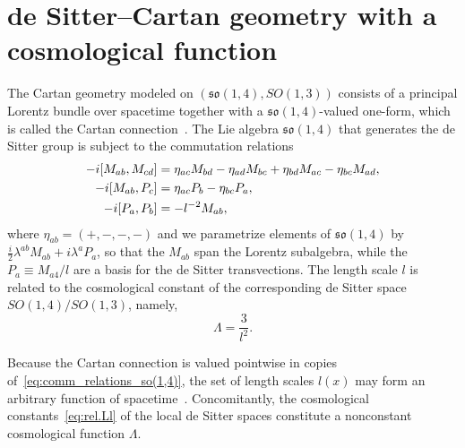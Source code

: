 \documentclass[%
aps,
prd,
reprint
]{revtex4-1}
\def\mf{\mathfrak}
\begin{document}
\section{de Sitter--Cartan geometry with a cosmological function}
\label{sec:dSCgeo}

The Cartan geometry modeled on $(\mf{so}(1,4),SO(1,3))$ 
consists of a principal Lorentz bundle over spacetime together 
with a $\mf{so}(1,4)$-valued one-form, which is called the 
Cartan connection~\cite{Alekseevsky:1995cc, sharpe1997diff_geo, 
  Wise:2009fu, Wise:2010sm}. The Lie algebra $\mf{so}(1,4)$ 
that generates the de Sitter group is subject to the commutation 
relations
\begin{align}
  -i[M_{ab},M_{cd}] &= \eta_{ac}M_{bd} - \eta_{ad}M_{bc} 
  + \eta_{bd}M_{ac} - \eta_{bc}M_{ad},
  \notag\\
  -i[M_{ab},P_c] &= \eta_{ac}P_b- \eta_{bc}P_a,
  \notag\\
  -i[P_a,P_b] &= -l^{-2}M_{ab},
  \label{eq:comm_relations_so(1,4)}
\end{align}
where $\eta_{ab} = (+, - , -, -)$ and we parametrize elements of 
$\mf{so}(1,4)$ by $\tfrac{i}{2} \lambda^{ab} M_{ab} + i \lambda^a 
P_a$, so that the $M_{ab}$ span the Lorentz subalgebra, while the 
$P_a \equiv M_{a4}/l$ are a basis for the de Sitter 
transvections. The length scale $l$ is related to the 
cosmological constant of the corresponding de Sitter space 
$SO(1,4)/SO(1,3)$, namely,~\cite{Wise:2010sm}
\begin{equation}
  \label{eq:rel.Ll}
  \Lambda = \frac{3}{l^2}.
\end{equation}

Because the Cartan connection is valued pointwise in copies 
of~\eqref{eq:comm_relations_so(1,4)}, the set of length scales 
$l(x)$ may form an arbitrary function of 
spacetime~\cite{Jennen:2014mba, Westman:2014yca}. Concomitantly, 
the cosmological constants~\eqref{eq:rel.Ll} of the local de 
Sitter spaces constitute a nonconstant cosmological function 
$\Lambda$.
\end{document}
